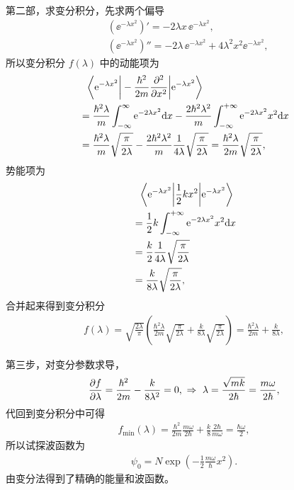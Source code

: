 第二部，求变分积分，先求两个偏导
\begin{align}
    &(\ee^{-\lambda x^2})' = -2\lambda x\,\ee^{-\lambda x^2}, \\
    &(\ee^{-\lambda x^2})'' = -2\lambda \,\ee^{-\lambda x^2} + 4 \lambda^2 x^2 \ee^{-\lambda x^2},
\end{align}
所以变分积分 $f(\lambda)$ 中的动能项为
\begin{align}
    &\phantom{=}{}\bigg\langle \mathrm{e}^{-\lambda x^2} \bigg| -\frac{\hbar^2}{2m} \pdv[2]{x}  \bigg| \mathrm{e}^{-\lambda x^2} \bigg\rangle \\
    &= \frac{\hbar^2\lambda}m \int_{-\infty}^{\infty} \mathrm{e}^{-2\lambda x^2}\mathrm{d} x - \frac{2\hbar^2\lambda^2}m \int_{-\infty}^{+\infty} \mathrm{e}^{-2\lambda x^2} x^2 \mathrm{d} x \\
    &= \frac{\hbar^2\lambda}m \sqrt{\frac{\pi}{2\lambda}} - 
    \frac{2\hbar^2\lambda^2}m \frac1{4\lambda} \sqrt{\frac{\pi}{2\lambda}} = \frac{\hbar^2\lambda}{2m} \sqrt{\frac{\pi}{2\lambda}},
\end{align}
势能项为
\begin{align}
    &\phantom{=}{}\bigg\langle \mathrm{e}^{-\lambda x^2} \bigg|  \frac12 k x^2 \bigg| \mathrm{e}^{-\lambda x^2} \bigg\rangle \\
    &= \frac12 k \int_{- \infty}^{+ \infty} \mathrm{e}^{-2\lambda x^2} x^2 \mathrm{d} x \\
    &= \frac k2 \frac1{4\lambda} \sqrt{\frac{\pi}{2\lambda}} \\
    &= \frac{k}{8\lambda} \sqrt{\frac{\pi}{2\lambda}},
\end{align}
合并起来得到变分积分
\begin{align}
    f(\lambda) = \sqrt{\frac{2\lambda}{\pi}} \left(
        \frac{\hbar^2\lambda}{2m} \sqrt{\frac{\pi}{2\lambda}}
        + \frac{k}{8\lambda} \sqrt{\frac{\pi}{2\lambda}}
    \right) = \frac{\hbar^2\lambda}{2m} + \frac{k}{8\lambda},
\end{align}

第三步，对变分参数求导，
\begin{align}
    \pdv{f}{\lambda} = \frac{\hbar^2}{2m} - \frac{k}{8\lambda^2} = 0, \ \Rightarrow \ \lambda = \frac{\sqrt{mk}}{2\hbar} = \frac{m\omega}{2\hbar}, 
\end{align}
代回到变分积分中可得
\begin{align}
    f_\mathrm{min}(\lambda) = \frac{\hbar^2}{2m} \frac{m\omega}{2\hbar} + \frac k8 \frac{2\hbar}{m\omega} = \frac{\hbar\omega}2,
\end{align}
所以试探波函数为
\begin{align}
    \psi_0 = N \exp\left(-\frac12 \frac{m\omega}{\hbar}x^2\right). 
\end{align}
由变分法得到了精确的能量和波函数。

